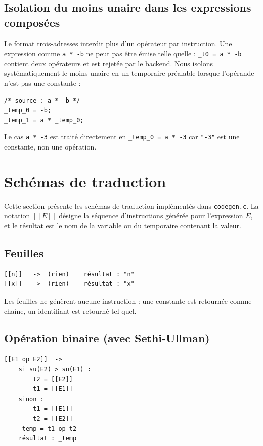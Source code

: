 \documentclass[12pt,a4paper]{article}
\begin{document}
\subsection{Isolation du moins unaire dans les expressions composées}

Le format trois-adresses interdit plus d'un opérateur par instruction. Une expression comme \texttt{a * -b} ne peut pas être émise telle quelle : \texttt{\_t0 = a * -b} contient deux opérateurs et est rejetée par le backend. Nous isolons systématiquement le moins unaire en un temporaire préalable lorsque l'opérande n'est pas une constante :

\begin{lstlisting}
/* source : a * -b */
_temp_0 = -b;
_temp_1 = a * _temp_0;
\end{lstlisting}

Le cas \texttt{a * -3} est traité directement en \texttt{\_temp\_0 = a * -3} car \texttt{"-3"} est une constante, non une opération.

\section{Schémas de traduction}

Cette section présente les schémas de traduction implémentés dans \texttt{codegen.c}. La notation $[\![E]\!]$ désigne la séquence d'instructions générée pour l'expression $E$, et le résultat est le nom de la variable ou du temporaire contenant la valeur.

\subsection{Feuilles}

\begin{lstlisting}
[[n]]   ->  (rien)    résultat : "n"
[[x]]   ->  (rien)    résultat : "x"
\end{lstlisting}

Les feuilles ne génèrent aucune instruction : une constante est retournée comme chaîne, un identifiant est retourné tel quel.

\subsection{Opération binaire (avec Sethi-Ullman)}

\begin{lstlisting}
[[E1 op E2]]  ->
    si su(E2) > su(E1) :
        t2 = [[E2]]
        t1 = [[E1]]
    sinon :
        t1 = [[E1]]
        t2 = [[E2]]
    _temp = t1 op t2
    résultat : _temp
\end{lstlisting}
\end{document}
